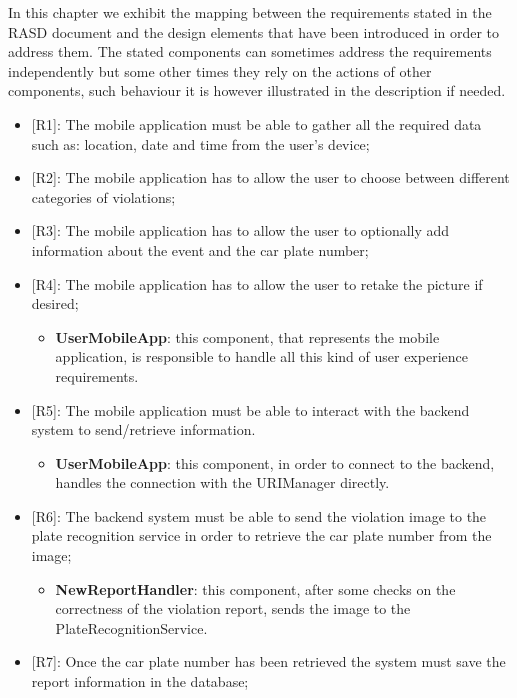 In this chapter we exhibit the mapping between the requirements stated in the RASD document and the design elements that have been introduced in order to address them. The stated components can sometimes address the requirements independently but some other times they rely on the actions of other components, such behaviour it is however illustrated in the description if needed. 

\begin{itemize} 
    \item {[R1]}: The mobile application must be able to gather all the required data such as: location, date and time from the user's device;
    \item[] {[R2]}: The mobile application has to allow the user to choose between different categories of violations;
    \item[] {[R3]}: The mobile application has to allow the user to optionally add information about the event and the car plate number;
    \item[] {[R4]}: The mobile application has to allow the user to retake the picture if desired;
    \begin{itemize}
      \item \textbf{UserMobileApp}: this component, that represents the mobile application, is responsible to handle all this kind of user experience requirements.
    \end{itemize}
    \item {[R5]}: The mobile application must be able to interact with the backend system to send/retrieve information.
    \begin{itemize}
      \item \textbf{UserMobileApp}: this component, in order to connect to the backend, handles the connection with the URIManager directly.
    \end{itemize}      
    \item {[R6]}: The backend system must be able to send the violation image to the plate recognition service in order to retrieve the car plate number from the image;
    \begin{itemize}
      \item \textbf{NewReportHandler}: this component, after some checks on the correctness of the violation report, sends the image to the PlateRecognitionService.
    \end{itemize}  
    \item {[R7]}: Once the car plate number has been retrieved the system must save the report information in the database;

\end{itemize}
